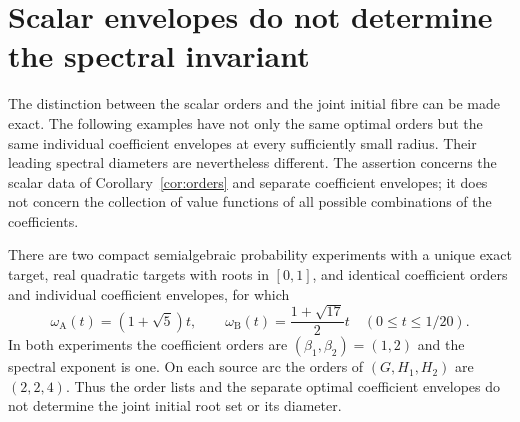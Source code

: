 \section{Scalar envelopes do not determine the spectral invariant}\label{sec:separation}
The distinction between the scalar orders and the joint initial fibre
can be made exact. The following examples have not only the same optimal
orders but the same individual coefficient envelopes at every sufficiently
small radius. Their leading spectral diameters are nevertheless different.
The assertion concerns the scalar data of Corollary~\ref{cor:orders} and
separate coefficient envelopes; it does not concern the collection of
value functions of all possible combinations of the coefficients.

\begin{theorem}\label{thm:scalar-separation}
There are two compact semialgebraic probability experiments with a unique
exact target, real quadratic targets with roots in $[0,1]$, and identical
coefficient orders and individual coefficient envelopes, for which
\[
 \omega_{\mathrm A}(t)=(1+\sqrt5)t,\qquad
 \omega_{\mathrm B}(t)=\frac{1+\sqrt{17}}2t
 \quad (0\le t\le 1/20).
\]
In both experiments the coefficient orders are $(\beta_1,\beta_2)=(1,2)$
and the spectral exponent is one. On each source arc the orders of
$(G,H_1,H_2)$ are $(2,2,4)$. Thus the order lists and the separate optimal
coefficient envelopes do not determine the joint initial root set or its
diameter.
\end{theorem}
